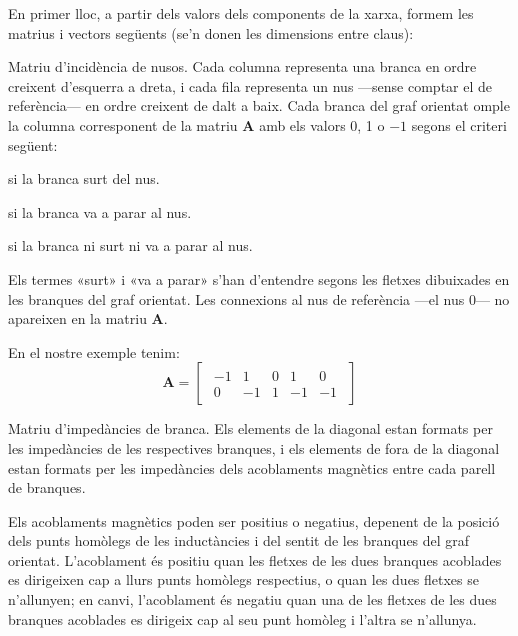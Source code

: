 En primer lloc, a partir dels valors dels components de la xarxa, formem les matrius i vectors següents (se'n donen les  dimensions entre claus):
\begin{list}{}
{\setlength{\labelwidth}{20mm} \setlength{\leftmargin}{20mm} \setlength{\labelsep}{2mm}}
   \item[$\boldsymbol{A}\{n\times b\}$] Matriu d'incidència de nusos. Cada columna representa una branca en ordre creixent d'esquerra a dreta, i cada fila representa un nus ---sense comptar el de referència--- en ordre creixent de dalt a baix. Cada branca del graf orientat omple la columna corresponent de la matriu $\boldsymbol{A}$ amb els valors 0, 1 o $-1$ segons el criteri següent:
   \begin{list}{}
   {\setlength{\labelwidth}{7mm} \setlength{\leftmargin}{9mm} \setlength{\labelsep}{2mm}}
      \item[1:]  si la branca surt del nus.
      \item[$-1$:] si la branca va a parar al nus.
      \item[0:]  si la branca ni surt ni va a parar al nus.
   \end{list}
   Els termes «surt» i «va a parar» s'han d'entendre segons les fletxes dibuixades en les branques del graf orientat. Les connexions al nus de referència ---el nus 0--- no apareixen en la matriu $\boldsymbol{A}$.

   En el nostre exemple tenim:
   \[
      \boldsymbol{A} = 
      \begin{bmatrix}\begin{array}{rrrrr} 
      		-1 & 1  & 0 &  1 & 0 \\  0 & -1 & 1 & -1 & -1
      \end{array}\end{bmatrix}
   \]

   \item[$\mcmplx{Z}\ped{B}\{b\times b\}$] Matriu d'impedàncies de branca. Els elements de la diagonal estan formats per les impedàncies de les respectives branques, i els elements de fora de la diagonal estan formats per les impedàncies dels acoblaments magnètics entre cada parell de branques.

   Els acoblaments magnètics poden ser positius o negatius, depenent
    de la posició dels punts homòlegs de les inductàncies i del sentit
    de les branques del graf orientat. L'acoblament és positiu quan les
    fletxes de les dues branques acoblades es dirigeixen cap a llurs punts
    homòlegs respectius, o quan les dues fletxes se n'allunyen; en canvi,
    l'acoblament és negatiu quan una de les fletxes de les dues branques
    acoblades es dirigeix cap al seu punt homòleg i l'altra se n'allunya.


\end{list}
